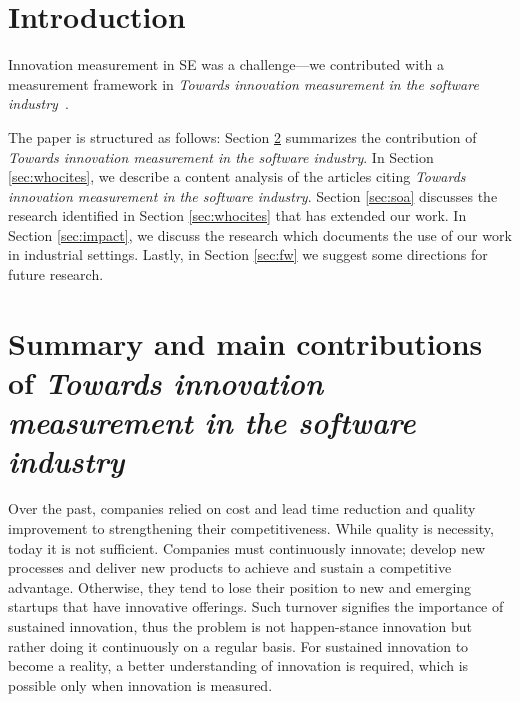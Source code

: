 \documentclass[sigplan]{acmart}
\newcommand{\theArticle}{\textit{Towards innovation measurement in the software industry}}
\begin{document}



\maketitle


\section{Introduction}\label{sec:intro}
Innovation measurement in SE was a challenge---we contributed with a measurement framework in \theArticle~\cite{EdisonAT13}. 

The paper is structured as follows: Section \ref{sec:sumpaper} summarizes the contribution of \theArticle. In Section \ref{sec:whocites}, we describe a content analysis of the articles citing \theArticle. Section \ref{sec:soa} discusses the research identified in Section \ref{sec:whocites} that has extended our work. In Section \ref{sec:impact}, we discuss the research which documents the use of our work in industrial settings. Lastly, in Section \ref{sec:fw} we suggest some directions for future research.

\section{Summary and main contributions of \theArticle}\label{sec:sumpaper}
Over the past, companies relied on cost and lead time reduction and quality improvement to strengthening their competitiveness. While quality is necessity, today it is not sufficient. Companies must continuously innovate; develop new processes and deliver new products to achieve and sustain a competitive advantage. Otherwise, they tend to lose their position to new and emerging startups that have innovative offerings. Such turnover signifies the importance of sustained innovation, thus the problem is not happen-stance innovation but rather doing it continuously on a regular basis. For sustained innovation to become a reality, a better understanding of innovation is required, which is possible only when innovation is measured.
\end{document}
